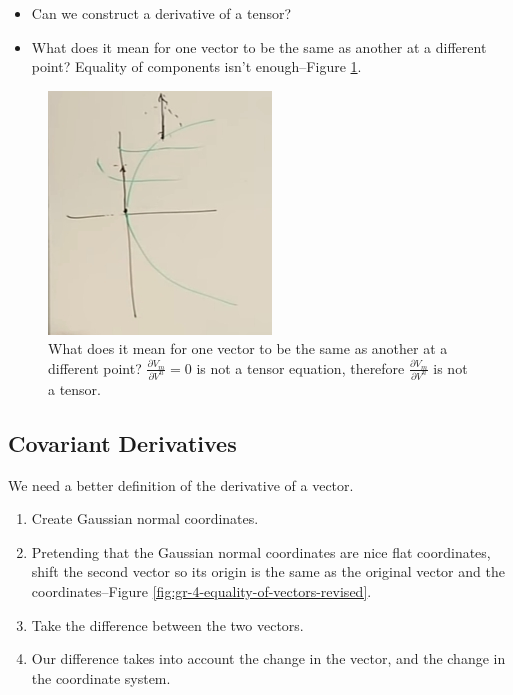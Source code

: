\documentclass[]{article}
\begin{document}
\begin{itemize}
	\item Can we construct a derivative of a tensor?
	\item What does it mean for one vector to be the same as another at a different point? Equality of components isn't enough--Figure \ref{fig:gr-4-equality-of-vectors}. 
\end{itemize}

\begin{figure}[H]
	\begin{center}
		\caption[Comparing vectors at different points]{What does it mean for one vector to be the same as another at a different point? $\frac{\partial V_m}{\partial V^n}=0$ is not a tensor equation, therefore $\frac{\partial V_m}{\partial V^n}$ is not a tensor.}\label{fig:gr-4-equality-of-vectors}
		\includegraphics{gr-4-equality-of-vectors}
	\end{center}
\end{figure}

\subsection{Covariant Derivatives}

We need a better definition of the derivative of a vector.

\begin{enumerate}
	\item Create Gaussian normal coordinates.
	\item Pretending that the Gaussian normal coordinates are nice flat coordinates, shift the second vector so its origin is the same as the original vector and the coordinates--Figure \ref{fig:gr-4-equality-of-vectors-revised}.
	\item Take the difference between the two vectors.
	\item Our difference takes into account the change in the vector, and the change in the coordinate system.
\end{enumerate}
\end{document}
